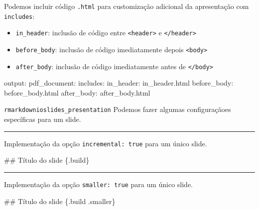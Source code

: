 \documentclass[
  10pt,
  ignorenonframetext,
]{beamer}
\newenvironment{Shaded}{\begin{snugshade}}{\end{snugshade}}
\newcommand{\AttributeTok}[1]{\textcolor[rgb]{0.40,0.45,0.13}{#1}}
\newcommand{\FunctionTok}[1]{\textcolor[rgb]{0.28,0.35,0.67}{#1}}
\newcommand{\KeywordTok}[1]{\textcolor[rgb]{0.00,0.23,0.31}{#1}}
\providecommand{\tightlist}{%
  \setlength{\itemsep}{0pt}\setlength{\parskip}{0pt}}\usepackage{longtable,booktabs,array}
\newcommand*{\regrafina}{\rule{\textwidth}{0.5pt}}
\begin{document}
\begin{frame}[fragile]
Podemos incluir código \texttt{.html} para customização adicional da
apresentação com \texttt{includes}:

\begin{itemize}
\tightlist
\item
  \texttt{in\_header}: inclusão de código entre
  \texttt{\textless{}header\textgreater{}} e
  \texttt{\textless{}/header\textgreater{}}
\item
  \texttt{before\_body}: inclusão de código imediatamente depois
  \texttt{\textless{}body\textgreater{}}
\item
  \texttt{after\_body}: inclusão de código imediatamente antes de
  \texttt{\textless{}/body\textgreater{}}
\end{itemize}

\begin{Shaded}
\begin{Highlighting}[]
\FunctionTok{output}\KeywordTok{:}
\AttributeTok{  }\FunctionTok{pdf\_document}\KeywordTok{:}
\AttributeTok{    }\FunctionTok{includes}\KeywordTok{:}
\AttributeTok{      }\FunctionTok{in\_header}\KeywordTok{:}\AttributeTok{ in\_header.html}
\AttributeTok{      }\FunctionTok{before\_body}\KeywordTok{:}\AttributeTok{ before\_body.html}
\AttributeTok{      }\FunctionTok{after\_body}\KeywordTok{:}\AttributeTok{ after\_body.html}
\end{Highlighting}
\end{Shaded}
\end{frame}

\begin{frame}[fragile]{\texttt{rmarkdown}\newline \texttt{ioslides\_presentation}}
\protect\hypertarget{rmarkdownioslides_presentation-4}{}
Podemos fazer algumas configuraçãoes específicas para um slide.

\regrafina

Implementação da opção \texttt{incremental:\ true} para um único slide.

\begin{Shaded}
\begin{Highlighting}[]
\FunctionTok{\#\# Título do slide \{.build\}}
\end{Highlighting}
\end{Shaded}

\regrafina

Implementação da opção \texttt{smaller:\ true} para um único slide.

\begin{Shaded}
\begin{Highlighting}[]
\FunctionTok{\#\# Título do slide \{.build .smaller\}}
\end{Highlighting}
\end{Shaded}
\end{frame}
\end{document}
